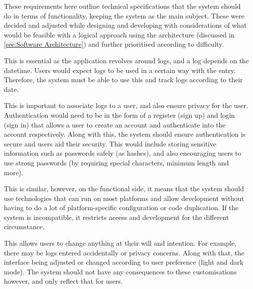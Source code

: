 \documentclass[../main.tex]{subfiles}
\begin{document}
These requirements here outline technical specifications that the system should do in terms of functionality, keeping the system as the main subject. These were decided and adjusted while designing and developing with considerations of what would be feasible with a logical approach using the architecture (discussed in \ref{sec:Software Architecture}) and further prioritised according to difficulty.


This is essential as the application revolves around logs, and a log depends on the datetime. Users would expect logs to be used in a certain way with the entry. Therefore, the system must be able to use this and track logs according to their date.


This is important to associate logs to a user, and also ensure privacy for the user. Authentication would need to be in the form of a register (sign up) and login (sign in) that allows a user to create an account and authenticate into the account respectively. Along with this, the system should ensure authentication is secure and users aid their security. This would include storing sensitive information such as passwords safely (as hashes), and also encouraging users to use strong passwords (by requiring special characters, minimum length and more).


This is similar, however, on the functional side, it means that the system should use technologies that can run on most platforms and allow development without having to do a lot of platform-specific configuration or code duplication. If the system is incompatible, it restricts access and development for the different circumstance.


This allows users to change anything at their will and intention. For example, there may be logs entered accidentally or privacy concerns. Along with that, the interface being adjusted or changed according to user preference (light and dark mode). The system should not have any consequences to these customisations however, and only reflect that for users.

\end{document}

